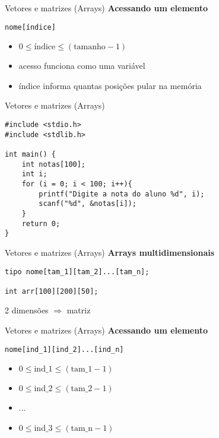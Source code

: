 \documentclass[10pt]{beamer}
\begin{document}
\begin{frame}[fragile]{Vetores e matrizes (Arrays)}
    \huge
    \textbf{Acessando um elemento}

    \bigskip

    \begin{verbatim}
nome[índice]
    \end{verbatim}

    \Large
    \setlength{\leftmargini}{0pt}
    \begin{itemize}
        \item [] $0 \leq \text{índice} \leq (\text{tamanho} - 1)$ \faExclamationTriangle
        \item [] acesso funciona como uma variável
        \item [] índice informa quantas posições pular na memória
    \end{itemize}
\end{frame}

\begin{frame}[fragile]{Vetores e matrizes (Arrays)}
    \begin{verbatim}
#include <stdio.h>
#include <stdlib.h>

int main() {
    int notas[100];
    int i;
    for (i = 0; i < 100; i++){
        printf("Digite a nota do aluno %d", i);
        scanf("%d", &notas[i]);
    }
    return 0;
}
    \end{verbatim}
\end{frame}

\begin{frame}[fragile]{Vetores e matrizes (Arrays)}
    \huge
    \textbf{Arrays multidimensionais}

    \bigskip

    \Large
    \begin{verbatim}
tipo nome[tam_1][tam_2]...[tam_n];

int arr[100][200][50];
    \end{verbatim}


    2 dimensões $\Longrightarrow$ matriz
\end{frame}

\begin{frame}[fragile]{Vetores e matrizes (Arrays)}
    \huge
    \textbf{Acessando um elemento}

    \bigskip

    \Large
    \begin{verbatim}
nome[ind_1][ind_2]...[ind_n]
    \end{verbatim}

    \setlength{\leftmargini}{0pt}
    \begin{itemize}
        \item [] $0 \leq \text{ind\_1} \leq (\text{tam\_1} - 1)$
        \item [] $0 \leq \text{ind\_2} \leq (\text{tam\_2} - 1)$
        \item [] ...
        \item [] $0 \leq \text{ind\_3} \leq (\text{tam\_n} - 1)$
    \end{itemize}
\end{frame}
\end{document}
